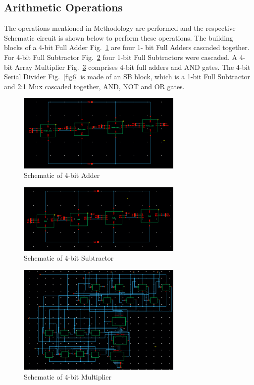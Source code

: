 \documentclass[conference]{IEEEtran}
\begin{document}
\subsection{Arithmetic Operations}\label{DA}
The operations mentioned in Methodology are performed and the respective Schematic circuit is shown below to perform these operations. The building blocks of a 4-bit  Full Adder Fig.~\ref{fig3} are four 1- bit Full Adders cascaded together. For 4-bit  Full Subtractor Fig.~\ref{fig4} four 1-bit Full Subtractors were cascaded. A 4-bit Array Multiplier Fig.~\ref{fig5} comprises 4-bit full adders and AND gates. The 4-bit Serial Divider Fig.~\ref{fig6} is made of an SB block, which is a 1-bit Full Subtractor and 2:1 Mux cascaded together, AND, NOT and OR gates.
\begin{figure}[htbp]
\centerline{\includegraphics[width=8cm,keepaspectratio,]{"4bit_Adder.png"}}
\caption{Schematic of 4-bit Adder}
\label{fig3}
\end{figure}
\begin{figure}[htbp]
\centerline{\includegraphics[width=8cm,keepaspectratio,]{"4bit_Subtractor.png"}}
\caption{Schematic of 4-bit Subtractor}
\label{fig4}
\end{figure}
\begin{figure}[htbp]
\centerline{\includegraphics[width=8cm,keepaspectratio,]{"4bit_Multiplier.png"}}
\caption{Schematic of 4-bit Multiplier}
\label{fig5}
\end{figure}
\end{document}
